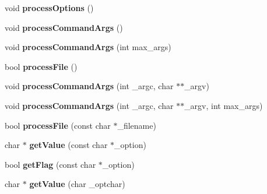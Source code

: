 \begin{DoxyCompactItemize}
\item 
void {\bfseries process\+Options} ()\hypertarget{class_any_option_a0b123acf86297aa6265229bdd13a827a}{}\label{class_any_option_a0b123acf86297aa6265229bdd13a827a}

\item 
void {\bfseries process\+Command\+Args} ()\hypertarget{class_any_option_a1f21716ac11330a364fe1d8a17efa7dc}{}\label{class_any_option_a1f21716ac11330a364fe1d8a17efa7dc}

\item 
void {\bfseries process\+Command\+Args} (int max\+\_\+args)\hypertarget{class_any_option_acbb92b2ed06429530419797e27a66835}{}\label{class_any_option_acbb92b2ed06429530419797e27a66835}

\item 
bool {\bfseries process\+File} ()\hypertarget{class_any_option_ac1de1647788ce0f5bed576d90e518124}{}\label{class_any_option_ac1de1647788ce0f5bed576d90e518124}

\item 
void {\bfseries process\+Command\+Args} (int \+\_\+argc, char $\ast$$\ast$\+\_\+argv)\hypertarget{class_any_option_a6eb4b1407b58fff76dd94d41f3c5af72}{}\label{class_any_option_a6eb4b1407b58fff76dd94d41f3c5af72}

\item 
void {\bfseries process\+Command\+Args} (int \+\_\+argc, char $\ast$$\ast$\+\_\+argv, int max\+\_\+args)\hypertarget{class_any_option_a3722651e433d69c380f88f76075d7809}{}\label{class_any_option_a3722651e433d69c380f88f76075d7809}

\item 
bool {\bfseries process\+File} (const char $\ast$\+\_\+filename)\hypertarget{class_any_option_a9f28e85054331866e0f32bf5a8088607}{}\label{class_any_option_a9f28e85054331866e0f32bf5a8088607}

\item 
char $\ast$ {\bfseries get\+Value} (const char $\ast$\+\_\+option)\hypertarget{class_any_option_aebf849538e3a6e8b05075231bf22a609}{}\label{class_any_option_aebf849538e3a6e8b05075231bf22a609}

\item 
bool {\bfseries get\+Flag} (const char $\ast$\+\_\+option)\hypertarget{class_any_option_a4ea37ce527b713f9a6d15d3a3ea837ef}{}\label{class_any_option_a4ea37ce527b713f9a6d15d3a3ea837ef}

\item 
char $\ast$ {\bfseries get\+Value} (char \+\_\+optchar)\hypertarget{class_any_option_ad31c09eeb4b654bd029284d910a2dab4}{}\label{class_any_option_ad31c09eeb4b654bd029284d910a2dab4}


\end{DoxyCompactItemize}
